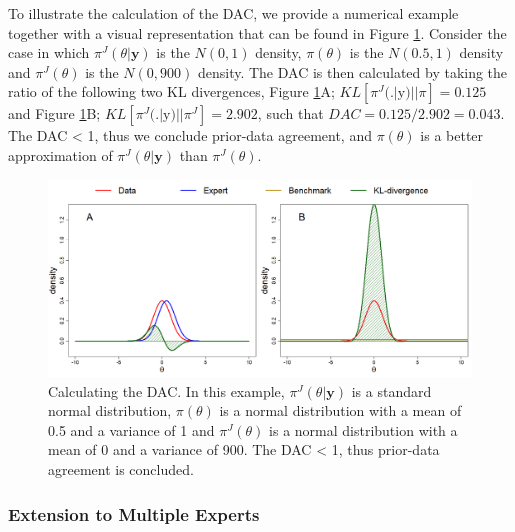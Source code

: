 \documentclass[openright,titlepage,12pt,a4paper]{book}
\begin{document}
To illustrate the calculation of the DAC, we provide a numerical example together with a visual representation that can be found in Figure \ref{fig:ch03fig2}. Consider the case in which \(\pi^J(\theta|\textbf{y})\) is the \(N(0,1)\) density, \(\pi(\theta)\) is the \(N(0.5,1)\) density and \(\pi^J(\theta)\) is the \(N(0,900)\) density. The DAC is then calculated by taking the ratio of the following two KL divergences, Figure \ref{fig:ch03fig2}A; \(KL[\pi^J(.|\textrm{y})||\pi] = 0.125\) and Figure \ref{fig:ch03fig2}B; \(KL[\pi^J(.|\textrm{y})||\pi^J] = 2.902\), such that \(DAC = 0.125/2.902 = 0.043\). The DAC \textless{} 1, thus we conclude prior-data agreement, and \(\pi(\theta)\) is a better approximation of \(\pi^J(\theta|\textbf{y})\) than \(\pi^J(\theta)\).

\begin{figure}

{\centering \includegraphics[width=0.9\linewidth]{figures/chapter_3/Figure2} 

}

\caption{Calculating the DAC. In this example,  $\pi^J(\theta|\textbf{y})$ is a standard normal distribution,  $\pi(\theta)$ is a normal distribution with a mean of 0.5 and a variance of 1 and  $\pi^J(\theta)$ is a normal distribution with a mean of 0 and a variance of 900. The DAC < 1, thus prior-data agreement is concluded.}\label{fig:ch03fig2}
\end{figure}

\hypertarget{extension-to-multiple-experts}{%
\subsubsection{Extension to Multiple Experts}\label{extension-to-multiple-experts}}
\end{document}
